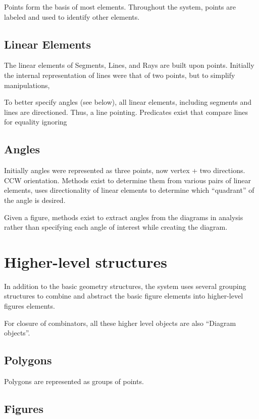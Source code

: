 Points form the basis of most elements. Throughout the system, points
are labeled and used to identify other elements.

\subsection{Linear Elements}

The linear elements of Segments, Lines, and Rays are built upon
points. Initially the internal representation of lines were that of
two points, but to simplify manipulations,

To better specify angles (see below), all linear elements, including
segments and lines are directioned. Thus, a line pointing. Predicates
exist that compare lines for equality ignoring

\subsection{Angles}

Initially angles were represented as three points, now vertex + two
directions. CCW orientation. Methods exist to determine them from
various pairs of linear elements, uses directionality of linear
elements to determine which ``quadrant'' of the angle is desired.

Given a figure, methods exist to extract angles from the diagrams in
analysis rather than specifying each angle of interest while creating
the diagram.

\section{Higher-level structures}

In addition to the basic geometry structures, the system uses several
grouping structures to combine and abstract the basic figure elements
into higher-level figures elements.

For closure of combinators, all these higher level objects are also
``Diagram objects''.

\subsection{Polygons}

Polygons are represented as groups of points.

\subsection{Figures}

